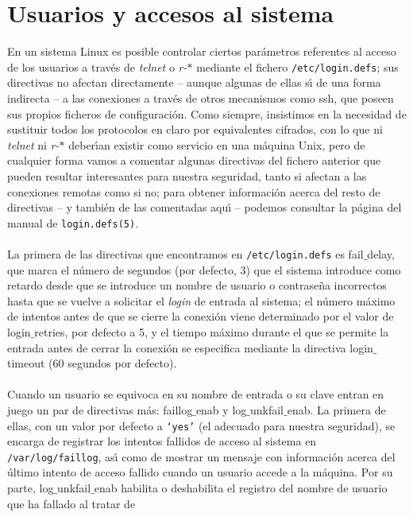 \section{Usuarios y accesos al sistema}
En un sistema Linux es posible controlar ciertos par\'ametros referentes al
acceso de los usuarios a trav\'es de {\it telnet} o {\it r-$\ast$} mediante
el fichero {\tt /etc/login.defs}; sus directivas no afectan directamente --
aunque algunas de ellas s\'{\i} de una forma indirecta -- a las conexiones a 
trav\'es de otros mecanismos como {\sc ssh}, que poseen sus propios ficheros de
configuraci\'on. Como siempre, insistimos en la necesidad de sustituir
todos los protocolos en claro por equivalentes cifrados, con lo que ni {\it
telnet} ni {\it r-$\ast$} deber\'{\i}an existir como servicio en una m\'aquina
Unix, pero de cualquier forma vamos a comentar algunas directivas del fichero
anterior que pueden resultar interesantes para nuestra seguridad, tanto si
afectan a las conexiones remotas como si no; para obtener informaci\'on acerca
del resto de directivas -- y tambi\'en de las comentadas aqu\'{\i} -- podemos
consultar la p\'agina del manual de {\tt login.defs(5)}.\\
\\La primera de las directivas que encontramos en {\tt /etc/login.defs} es
{\sc fail$\_$delay}, que marca el n\'umero de segundos (por defecto, 3) que el 
sistema introduce como retardo desde que se introduce un nombre de usuario o 
contrase\~na incorrectos hasta que se vuelve a solicitar el {\it login} de 
entrada al sistema; el n\'umero m\'aximo de intentos antes de que se cierre
la conexi\'on viene determinado por el valor de {\sc login$\_$retries}, por
defecto a 5, y el tiempo m\'aximo durante el que se permite la entrada antes
de cerrar la conexi\'on se especifica mediante la directiva {\sc 
login$\_$timeout} (60 segundos por defecto).\\
\\Cuando un usuario se equivoca en su nombre de entrada o su clave entran en 
juego un par de directivas
m\'as: {\sc faillog$\_$enab} y {\sc log$\_$unkfail$\_$enab}. La primera de 
ellas, con un valor por defecto a {\tt `yes'} (el adecuado para nuestra 
seguridad), se encarga de registrar los intentos fallidos de acceso al sistema
en {\tt /var/log/faillog}, as\'{\i} como de mostrar un mensaje con 
informaci\'on acerca del \'ultimo intento de acceso fallido cuando un usuario 
accede a la m\'aquina. Por su parte, {\sc log$\_$unkfail$\_$enab} habilita o
deshabilita el registro del nombre de usuario que ha fallado al tratar de
